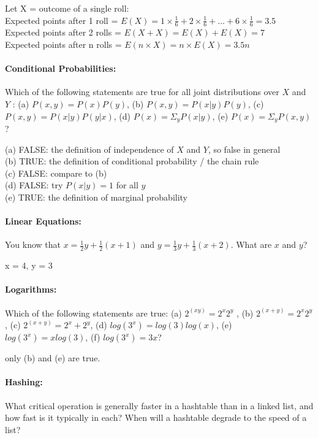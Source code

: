 \documentclass[12pt,twoside]{article}
\begin{document}
{\color{red}

Let X = outcome of a single roll:\\
Expected points after 1 roll = $E({X})=1\times \frac{1}{6} + 2 \times \frac{1}{6} + \dots + 6 \times \frac{1}{6} = 3.5$ \\
Expected points after 2 rolls = $E({X+X})= E(X) + E(X) = 7$ \\
Expected points after n rolls = $E({n\times X})= n \times E(X) = 3.5 n $ \\

}


\paragraph{Conditional Probabilities:} Which of the following statements are true for all joint distributions over $X$ and $Y$ : (a) $P(x, y) = P(x)P(y)$, (b) $P(x, y) = P(x|y)P(y)$, (c) $P(x, y) = P(x|y)P(y|x)$, (d) $P(x) = \Sigma_y P(x|y)$, (e) $P(x) = \Sigma_y P(x, y)$?

{\color{red}

(a) FALSE: the definition of independence of $X$ and $Y$, so false in general \\
(b) TRUE: the definition of conditional probability / the chain rule \\
(c) FALSE: compare to (b) \\
(d) FALSE: try $P(x|y) = 1$ for all $y$ \\
(e) TRUE: the definition of marginal probability
}

\paragraph{Linear Equations:} You know that $x=\frac{1}{2}y+\frac{1}{2}(x+1)$ and $y=\frac{1}{3}y+\frac{1}{3}(x+2)$. What are $x$ and $y$?


{\color{red}
x = 4, y = 3
}

\paragraph{Logarithms:} Which of the following statements are true: (a) $2^{(xy)} = 2^x2^y$
, (b) $2^{(x+y)} = 2^x2^y$, (c) $2^{(x+y)} = 2^x + 2^y$, (d) $log(3^x) = log(3)log(x)$, (e) $log(3^x
) = x log(3)$, (f) $log(3^x) = 3x$?

{\color{red}
	only (b) and (e) are true.
}

\paragraph{Hashing:} What critical operation is generally faster in a hashtable than in a linked list, and how fast is it typically in each? When will a hashtable degrade to the speed of a list?
\end{document}
